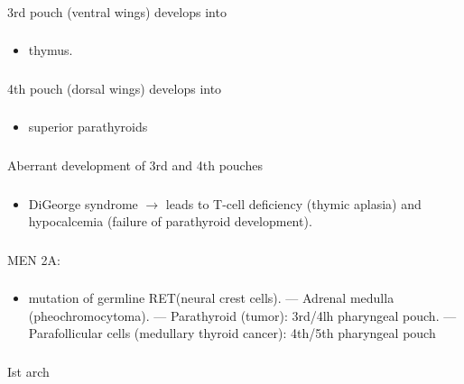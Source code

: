\documentclass[11pt]{beamer}
\begin{document}
\begin{frame}
 \frametitle{}
3rd pouch (ventral wings) develops into
\end{frame}

\begin{frame}
 \frametitle{}
\begin{itemize}
\item{thymus.}
\end{itemize}
\end{frame}

\begin{frame}
 \frametitle{}
4th pouch (dorsal wings) develops into
\end{frame}

\begin{frame}
 \frametitle{}
\begin{itemize}
\item{superior parathyroids}
\end{itemize}
\end{frame}

\begin{frame}
 \frametitle{}
Aberrant development of 3rd and 4th pouches 
\end{frame}

\begin{frame}
 \frametitle{}
\begin{itemize}
\item{DiGeorge syndrome ${\rightarrow}$ leads to T-cell deficiency (thymic aplasia) and hypocalcemia (failure of parathyroid development).}
\end{itemize}
\end{frame}

\begin{frame}
 \frametitle{}
MEN 2A:
\end{frame}

\begin{frame}
 \frametitle{}
\begin{itemize}
\item{mutation of germline RET(neural crest cells). — Adrenal medulla (pheochromocytoma). — Parathyroid (tumor): 3rd/4lh pharyngeal pouch. — Parafollicular cells (medullary thyroid cancer): 4th/5th pharyngeal pouch}
\end{itemize}
\end{frame}

\begin{frame}
 \frametitle{}
Ist arch
\end{frame}
\end{document}
